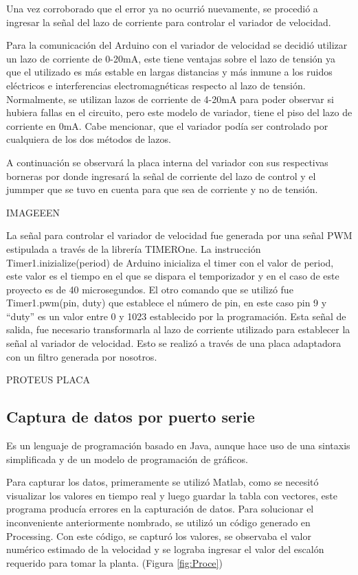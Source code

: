 Una vez corroborado que el error ya no ocurrió nuevamente, se procedió a ingresar la señal del lazo de corriente para controlar el variador de velocidad.

Para la comunicación del Arduino con el variador de velocidad se decidió utilizar un lazo de corriente de 0-20mA, este tiene ventajas sobre el lazo de tensión ya que el utilizado es más estable en largas distancias y más inmune a los ruidos eléctricos e interferencias electromagnéticas respecto al lazo de tensión. Normalmente, se utilizan lazos de corriente de 4-20mA para poder observar si hubiera fallas en el circuito, pero este modelo de variador, tiene el piso del lazo de corriente en 0mA. Cabe mencionar, que el variador podía ser controlado por cualquiera de los dos métodos de lazos.

A continuación se observará la placa interna del variador con sus respectivas borneras por donde ingresará la señal de corriente del lazo de control y el jummper que se tuvo en cuenta para que sea de corriente y no de tensión.


IMAGEEEN

La señal para controlar el variador de velocidad fue generada por una señal PWM estipulada a través de la librería TIMEROne. La instrucción Timer1.inizialize(period)
 de Arduino inicializa el timer con el valor de period, este valor es el tiempo en el que se dispara el temporizador y en el caso de este proyecto es de 40 microsegundos.
El otro comando que se utilizó fue Timer1.pwm(pin, duty) que establece el número de pin, en este caso pin 9 y “duty” es un valor entre 0 y 1023 establecido por la programación. 
Esta señal de salida, fue necesario transformarla al lazo de corriente utilizado para establecer la señal al variador de velocidad. Esto se realizó a través de una placa adaptadora con un filtro generada por nosotros.

PROTEUS PLACA


\subsection{Captura de datos por puerto serie}
\begin{tcolorbox}[colback=blue!5!white,colframe=blue!75!black,title=Processing]
    Es un lenguaje de programación basado en Java, aunque hace uso de una sintaxis simplificada y de un modelo de programación de gráficos.
    \end{tcolorbox}
Para capturar los datos, primeramente se utilizó Matlab, como se necesitó visualizar los valores en tiempo real y luego guardar la tabla con vectores, este programa producía errores en la capturación de datos.
Para solucionar el inconveniente anteriormente nombrado, se utilizó un código generado en Processing. Con este código, se capturó los valores, se observaba el valor numérico estimado de la velocidad y se lograba ingresar el valor del escalón requerido para tomar la planta. (Figura \ref{fig:Proce})

